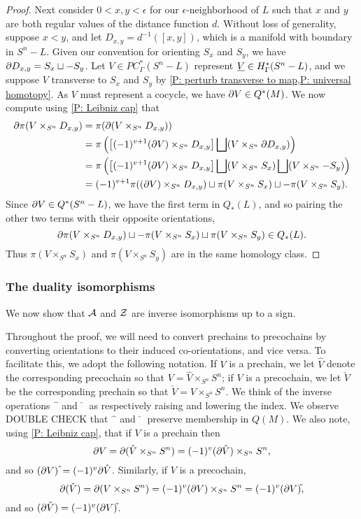 \begin{example}
\begin{proof}
Next consider $0 < x, y < \epsilon$ for our $\epsilon$-neighborhood of $L$ such that $x$ and $y$ are both regular values of the distance function $d$.
Without loss of generality, suppose $x < y$, and let $D_{x,y} = d^{-1}([x,y])$, which is a manifold with boundary in $S^n-L$.
Given our convention for orienting $S_x$ and $S_y$, we have $\partial D_{x,y} = S_x \sqcup -S_y$.
Let $V \in PC^*_\Gamma(S^n-L)$ represent $\underline{V} \in H^*_\Gamma(S^n - L)$, and we suppose $V$ transverse to $S_x$ and $S_y$ by \cref{P: perturb transverse to map,P: universal homotopy}.
As $V$ must represent a cocycle, we have $\partial V \in Q^*(M)$.
We now compute using \cref{P: Leibniz cap} that
\begin{align*}
\partial \pi(V \times_{S^n} D_{x,y}) &= \pi(\partial (V \times_{S^n} D_{x,y}))\\
&= \pi\left(\left[(-1)^{v+1} (\partial V) \times_{S^n}D_{x,y} \right] \bigsqcup (V \times_{S^n} \partial D_{x,y})\right)\\
&= \pi\left(\left[(-1)^{v+1} (\partial V) \times_{S^n}D_{x,y} \right] \bigsqcup (V \times_{S^n} S_x)\bigsqcup (V \times_{S^n} -S_y)\right)\\
&=(-1)^{v+1} \pi((\partial V) \times_{S^n}D_{x,y}) \sqcup \pi(V \times_{S^n} S_x) \sqcup -\pi(V \times_{S^n} S_y).
\end{align*}
Since $\partial V \in Q^*(S^n-L)$, we have the first term in $Q_*(L)$, and so pairing the other two terms with their opposite orientations,
$$\partial \pi(V \times_{S^n} D_{x,y})\sqcup -\pi(V \times_{S^n} S_x) \sqcup \pi(V \times_{S^n} S_y) \in Q_*(L).$$
Thus $\pi(V \times_{S^n} S_x)$ and $\pi(V \times_{S^n} S_y)$ are in the same homology class.
\end{proof}


\subsubsection{The duality isomorphisms} We now show that $\mathcal{A}$ and $\mathcal{Z}$ are inverse isomorphisms up to a sign.

Throughout the proof, we will need to convert prechains to precochains by converting orientations to their induced co-orientations, and vice versa.
To facilitate this, we adopt the following notation.
If $V$ is a prechain, we let $\hat V$ denote the corresponding precochain so that $V = \hat V \times_{S^n} S^n$; if $V$ is a precochain, we let $\check V$ be the corresponding prechain so that $\check V = V \times_{S^n} S^n$.
We think of the inverse operations $\hat{\phantom{a}}$ and $\check{\phantom{a}}$ as respectively raising and lowering the index.
We observe DOUBLE CHECK that $\hat{\phantom{a}}$ and $\check{\phantom{a}}$ preserve membership in $Q(M)$.
We also note, using \cref{P: Leibniz cap}, that if $V$ is a prechain then
 $$\partial V = \partial(\hat V \times_{S^n} S^n) = (-1)^{v} (\partial \hat V) \times_{S^n} S^n,$$
and so $(\bd V)\,\hat{\vrule height1.3ex width0pt} = (-1)^{v} \bd \hat V$.
Similarly, if $V$ is a precochain,  $$\bd(\check V) = \bd(V \times_{S^n} S^n) = (-1)^{v} (\bd V) \times_{S^n} S^n = (-1)^v (\bd V)\check{\vrule height1.3ex width0pt},$$
and so $(\bd \check V) = (-1)^{v} (\bd V)\check{\vrule height1.3ex width0pt}$.



\end{example}

